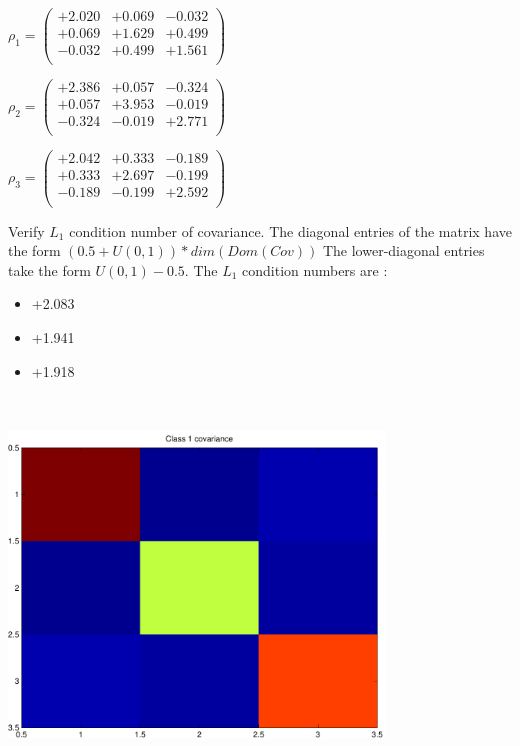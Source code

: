 \documentclass[9pt]{article}
\theoremstyle{plain}
\theoremstyle{definition}
\theoremstyle{remark}
\numberwithin{equation}{section}
\begin{document}
$\rho_1 = \left(
\begin{array}{
ccc}
+2.020 & +0.069 & -0.032 \\
+0.069 & +1.629 & +0.499 \\
-0.032 & +0.499 & +1.561 \\
\end{array}
\right)$ \newline 

$\rho_2 = \left(
\begin{array}{
ccc}
+2.386 & +0.057 & -0.324 \\
+0.057 & +3.953 & -0.019 \\
-0.324 & -0.019 & +2.771 \\
\end{array}
\right)$ \newline 

$\rho_3 = \left(
\begin{array}{
ccc}
+2.042 & +0.333 & -0.189 \\
+0.333 & +2.697 & -0.199 \\
-0.189 & -0.199 & +2.592 \\
\end{array}
\right)$ \newline 

Verify $L_1$ condition number of covariance. The diagonal entries of the matrix have the form $(0.5 + U(0,1) )*dim(Dom(Cov))$
The lower-diagonal entries take the form $U(0,1) - 0.5$. 
The $L_1$ condition numbers are :
\begin{itemize}
\item +2.083
\item +1.941
\item +1.918
\end{itemize}
\includegraphics[width=10.0cm,height=10.0cm]{rv1_corr.pdf}
\end{document}
